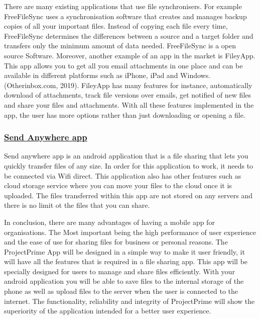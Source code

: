 \documentclass{article}
\begin{document}
There are many existing applications that use file synchronisers. For example FreeFileSync uses a synchronisation software that creates and manages backup copies of all your important files. Instead of copying each file every time, FreeFileSync determines the differences between a source and a target folder and transfers only the minimum amount of data needed. FreeFileSync is a open source Software. Moreover, another example of an app in the market is FileyApp. This app allows you to get all you email attachments in one place and can be available in different platforms such as iPhone, iPad and Windows. (Otherinbox.com, 2019).  FileyApp has many features for instance, automatically download of attachments, track file versions over emails, get notified of new files and share your files and attachments. With all these features implemented in the app, the user has more options rather than just downloading or opening a file.

\subsubsection{\underline{Send Anywhere app}}

Send anywhere app is an android application that  is a file sharing that lets you quickly transfer files of any size. In order for this application to work, it needs to be connected via Wifi direct. This application also has other features such as cloud storage service where you can move your files to the cloud once it is uploaded. The files transferred within this app are not stored on any servers and there is no limit ot the files that you can share.

In conclusion, there are many advantages of having a mobile app for organisations. The Most important being the high performance of user experience and the ease of use for sharing files for business or personal reasons. The ProjectPrime App will be designed in a simple way to make it user friendly, it will have all the features that is required in a file sharing app. This app will be specially designed for users to manage and share files efficiently. With your android application you will be able to save files to the internal storage of the phone as well as upload files to the server when the user is connected to the internet. The functionality, reliability and integrity of ProjectPrime will show the superiority of the application intended for a better user experience.
\end{document}
